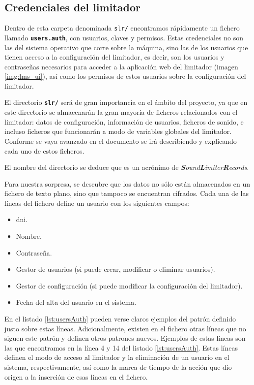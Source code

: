 \subsection{Credenciales del limitador}

Dentro de esta carpeta denominada \texttt{slr/} encontramos rápidamente un fichero llamado \textbf{\texttt{users.auth}}, con usuarios, claves y permisos. Estas credenciales no son las del sistema operativo que corre sobre la máquina, sino las de los usuarios que tienen acceso a la configuración del limitador, es decir, son los usuarios y contraseñas necesarios para acceder a la aplicación web del limitador (imagen \ref{img:lms_ui}), así como los permisos de estos usuarios sobre la configuración del limitador.

\begin{shaded}
    \noindent
    El directorio \textbf{\texttt{slr/}} será de gran importancia en el ámbito del proyecto, ya que en este directorio se almacenarán la gran mayoría de ficheros relacionados con el limitador: datos de configuración, información de usuarios, ficheros de sonido, e incluso ficheros que funcionarán a modo de variables globales del limitador. Conforme se vaya avanzado en el documento se irá describiendo y explicando cada uno de estos ficheros.
    \par
    \noindent
    El nombre del directorio se deduce que es un acrónimo de \textit{\textbf{S}ound\textbf{L}imiter\textbf{R}ecords}.
\end{shaded}

Para nuestra sorpresa, se descubre que los datos no sólo están almacenados en un fichero de texto plano, sino que tampoco se encuentran cifrados. Cada una de las líneas del fichero define un usuario con los siguientes campos:

\begin{itemize}
    \item \acrshort{dni}.
    \item Nombre.
    \item Contraseña.
    \item Gestor de usuarios (si puede crear, modificar o eliminar usuarios).
    \item Gestor de configuración (si puede modificar la configuración del limitador).
    \item Fecha del alta del usuario en el sistema.
\end{itemize}

En el listado \ref{lst:usersAuth} pueden verse claros ejemplos del patrón definido justo sobre estas líneas. Adicionalmente, existen en el fichero otras líneas que no siguen este patrón y definen otros patrones nuevos. Ejemplos de estas líneas son las que encontramos en la línea 4 y 14 del listado \ref{lst:usersAuth}. Estas líneas definen el modo de acceso al limitador y la eliminación de un usuario en el sistema, respectivamente, así como la marca de tiempo de la acción que dio origen a la inserción de esas líneas en el fichero.

